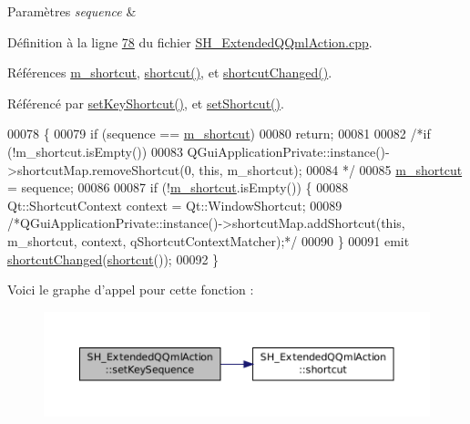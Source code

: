 \begin{DoxyParams}{Paramètres}
{\em sequence} & \\
\hline
\end{DoxyParams}


Définition à la ligne \hyperlink{SH__ExtendedQQmlAction_8cpp_source_l00078}{78} du fichier \hyperlink{SH__ExtendedQQmlAction_8cpp_source}{S\-H\-\_\-\-Extended\-Q\-Qml\-Action.\-cpp}.



Références \hyperlink{classSH__ExtendedQQmlAction_ac84d3a2113efb715321b905580b08bc5}{m\-\_\-shortcut}, \hyperlink{classSH__ExtendedQQmlAction_a070cac95bfc43b184ca1f0a75592877b}{shortcut()}, et \hyperlink{classSH__ExtendedQQmlAction_a2db5d52edf0a362a13971ebc04b870c1}{shortcut\-Changed()}.



Référencé par \hyperlink{classSH__ExtendedQQmlAction_aef8b6648357a2ea81a477e134ca885fa}{set\-Key\-Shortcut()}, et \hyperlink{classSH__ExtendedQQmlAction_a3e731c850a34194354e6e043dc249a39}{set\-Shortcut()}.


\begin{DoxyCode}
00078                                                                        \{
00079     \textcolor{keywordflow}{if} (sequence == \hyperlink{classSH__ExtendedQQmlAction_ac84d3a2113efb715321b905580b08bc5}{m\_shortcut})
00080         \textcolor{keywordflow}{return};
00081 
00082     \textcolor{comment}{/*if (!m\_shortcut.isEmpty())}
00083 \textcolor{comment}{        QGuiApplicationPrivate::instance()->shortcutMap.removeShortcut(0, this, m\_shortcut);}
00084 \textcolor{comment}{    */}
00085     \hyperlink{classSH__ExtendedQQmlAction_ac84d3a2113efb715321b905580b08bc5}{m\_shortcut} = sequence;
00086 
00087     \textcolor{keywordflow}{if} (!\hyperlink{classSH__ExtendedQQmlAction_ac84d3a2113efb715321b905580b08bc5}{m\_shortcut}.isEmpty()) \{
00088         Qt::ShortcutContext context = Qt::WindowShortcut;
00089         \textcolor{comment}{/*QGuiApplicationPrivate::instance()->shortcutMap.addShortcut(this, m\_shortcut, context,
       qShortcutContextMatcher);*/}
00090     \}
00091     emit \hyperlink{classSH__ExtendedQQmlAction_a2db5d52edf0a362a13971ebc04b870c1}{shortcutChanged}(\hyperlink{classSH__ExtendedQQmlAction_a070cac95bfc43b184ca1f0a75592877b}{shortcut}());
00092 \}
\end{DoxyCode}


Voici le graphe d'appel pour cette fonction \-:\nopagebreak
\begin{figure}[H]
\begin{center}
\leavevmode
\includegraphics[width=350pt]{classSH__ExtendedQQmlAction_a7d624821268cc19aa44bcda3cd85b967_cgraph}
\end{center}
\end{figure}




